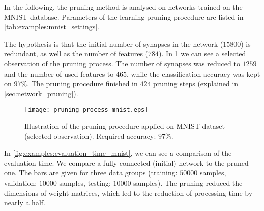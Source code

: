 In the following, the pruning method is analysed on networks trained on the MNIST database. Parameters of the learning-pruning procedure are listed in \cref{tab:examples:mnist_settings}.

\begin{table}[H]
\centering
{}
\caption{Experiment settings for the MNIST example.}
\label{tab:examples:mnist_settings}
\end{table}

The hypothesis is that the initial number of synapses in the network ($ 15800 $) is redundant, as well as the number of features ($ 784 $). In \cref{fig:examples:pruning_process_mnist} we can see a selected observation of the pruning process. The number of synapses was reduced to $ 1259 $ and the number of used features to $ 465 $, while the classification accuracy was kept on $ 97\% $. The pruning procedure finished in $ 424 $ pruning steps (explained in \cref{sec:network_pruning}).

\begin{figure}[H]
\centering
\texttt{[image: pruning\_process\_mnist.eps]}
\caption{Illustration of the pruning procedure applied on MNIST dataset (selected observation). Required accuracy: $ 97\% $.}
\label{fig:examples:pruning_process_mnist}
\end{figure}

In \cref{fig:examples:evaluation_time_mnist}, we can see a comparison of the evaluation time. We compare a fully-connected (initial) network to the pruned one. The bars are given for three data groups (training: $ 50000 $ samples, validation: $ 10000 $ samples, testing: $ 10000 $ samples). The pruning reduced the dimensions of weight matrices, which led to the reduction of processing time by nearly a half.

